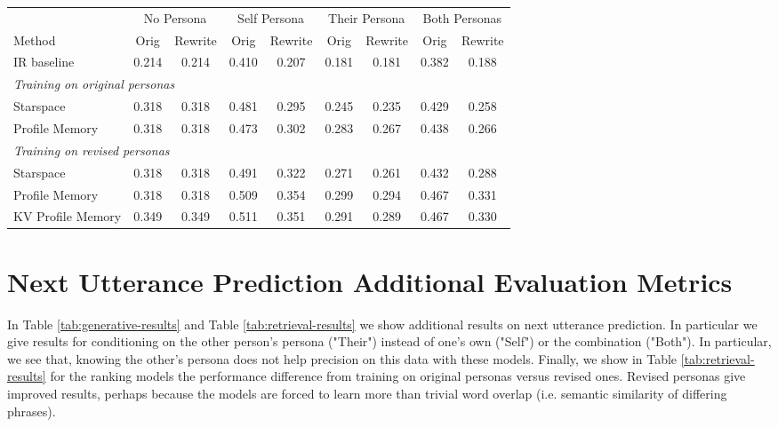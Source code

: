 \begin{table*}[t]
  \begin{center}
      \begin{tabular}{l|cc|cc|cc|cc }
      \toprule
      ~&  \multicolumn{2}{c}{No Persona} & \multicolumn{2}{|c}{Self Persona} & \multicolumn{2}{|c}{Their Persona} & \multicolumn{2}{|c}{Both Personas} \\ 
      Method & Orig & Rewrite & Orig & Rewrite & Orig & Rewrite & Orig & Rewrite \\ 
      \midrule
      IR baseline  &0.214 & 0.214 & 0.410 & 0.207  &  0.181  & 0.181 & 0.382& 0.188 \\
      \multicolumn{8}{l}{{\em Training on original personas}}\\
      Starspace    & 0.318 & 0.318 &  0.481  & 0.295& 0.245 & 0.235 & 0.429 & 0.258\\
      Profile Memory        &  0.318 & 0.318 & 0.473 & 0.302 & 0.283 & 0.267 & 0.438 & 0.266\\    
      \multicolumn{8}{l}{{\em Training on revised personas}}\\
      Starspace    &  0.318 & 0.318 & 0.491 & 0.322 & 0.271 & 0.261 & 0.432 & 0.288\\
      Profile Memory        &  0.318 & 0.318 & 0.509 & 0.354 & 0.299 & 0.294 & 0.467 & 0.331\\
      KV Profile Memory     &  0.349 & 0.349 & 0.511 & 0.351 & 0.291 &  0.289      &          0.467 &  0.330 \\
      \bottomrule
      \end{tabular}
      \caption{{\bf Evaluation of dialog utterance prediction with ranking models} using hits@1 in four settings: conditioned on the speakers persona ("self persona"), the dialogue partner's persona ("their persona"), both or none. The personas are either the original source given to Turkers to condition the dialogue, or the rewritten personas that do not have word overlap, explaining the poor performance of IR in that case. }
      \label{tab:retrieval-results}
  \end{center}
\end{table*}

\section{Next Utterance Prediction Additional Evaluation Metrics}

In Table \ref{tab:generative-results} and Table \ref{tab:retrieval-results} we show additional results on next utterance prediction.
In particular we give results for conditioning on the other person's persona ("Their") instead of one's own ("Self") or the combination ("Both"). In particular, we see that, knowing the other's persona does not help precision on this data with these models. Finally, we show in  Table \ref{tab:retrieval-results} for the ranking models the performance difference from training on original personas versus revised ones. Revised personas give improved results, perhaps because the models are forced to learn more than trivial word overlap (i.e. semantic similarity of differing phrases).


